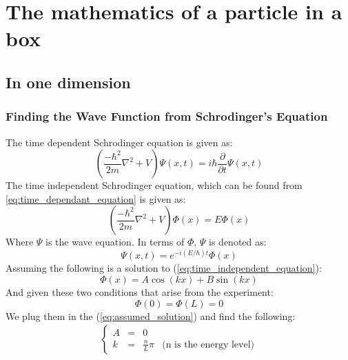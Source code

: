 \documentclass[a4paper, 10pt]{article}
\begin{document}
\newpage

\section{The mathematics of a particle in a box}
    \subsection{In one dimension}
        \subsubsection{Finding the Wave Function from Schrodinger's Equation}
        \label{sec:wave_equation_oned}
        The time dependent Schrodinger equation is given as:
        \begin{equation} \label{eq:time_dependant_equation}
            \left ( \frac{-\hbar^2}{2m} \nabla^2 + V \right ) \Psi(x,t)
            = i\hbar\frac{\partial}{\partial t}\Psi(x, t)   
        \end{equation}
        The time independent Schrodinger equation, which can be found from \ref{eq:time_dependant_equation}  is given as:
        \begin{equation} \label{eq:time_independent_equation}
            \left ( \frac{-\hbar^2}{2m} \nabla^2 + V \right ) \Phi(x)
            = E \Phi(x)
        \end{equation}
        Where $\Psi$ is the wave equation. In terms of $\Phi$, $\Psi$ is
        denoted as:
        \begin{equation} \label{eq:dep_in_equation}
            \Psi(x, t) = e^{-i(E/\hbar)t}\Phi(x)
        \end{equation}
        Assuming the following is a solution to (\ref{eq:time_independent_equation}):
        \begin{equation} \label{eq:assumed_solution}
            \Phi(x) = A\cos(kx) + B\sin(kx)
        \end{equation}
        And given these two conditions that arise from the experiment:
        $$ \Phi(0) = \Phi(L) = 0 $$
        We plug them in the (\ref{eq:assumed_solution}) and find the following:
        \begin{align}
            \left\{\begin{matrix}
            A & = & 0 \\ 
            k & = & \frac{n}{L}\pi & \text{(n is the energy level)}
            \end{matrix}\right.
        \end{align}
\end{document}
